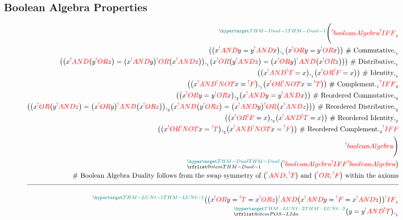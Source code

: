 \documentclass[a4paper]{article}
\makeatletter
\def\ml{\mleft}
\def\mr{\mright}
\newcommand{\cusnum}[2]{{#1}_{{\phantom{ }}_{#2}}}
\newcommand{\cusand}{,}
\newcommand{\cuspop}{.}
\newcommand{\eqComment}[1]{\text{  \# #1}}
\newcommand{\n}{\\[1.5ex] \hline \nonumber \\[0ex]}
\newcommand{\m}{\nonumber \\}
\newcommand\rfrlist[1]{%
    \forcsvlist{\rfrlist@item}{#1}
}
\newcommand\rfrlist@item[1]{\rfr{#1}\\}
\newcommand{\thmlink}[2]{{}_{\substack{\rfrlist{#1}}}^{\dfn{#2}} }
\makeatother
\begin{document}
\subsection{Boolean Algebra Properties}
\begin{tcolorbox}
\begin{align}
   \thmlink{}{THM-Dual-1} \Bigg(\rfr{booleanAlgebra} [\{\rfr{T}, \rfr{F}\}, \rfr{AND}, \rfr{OR}, \rfr{NOT}][] \cusnum{\rfr{IFF}}{1}
\m \ml(\ml(x \rfr{AND} y = y \rfr{AND} x\mr) \cusnum{\cusand}{1} \ml(x \rfr{OR} y = y \rfr{OR} x\mr)\mr) \eqComment{Commutative} \cusnum{\cusand}{1}
\m \ml(\ml(x \rfr{AND} \ml(y \rfr{OR} z\mr) = \ml(x \rfr{AND} y\mr) \rfr{OR} \ml(x \rfr{AND} z\mr)\mr) \cusnum{\cusand}{1} \ml(x \rfr{OR} \ml(y \rfr{AND} z\mr) = \ml(x \rfr{OR} y\mr) \rfr{AND} \ml(x \rfr{OR} z\mr)\mr)\mr) \eqComment{Distributive} \cusnum{\cusand}{1}
\m \ml(\ml(x \rfr{AND} \rfr{T} = x\mr) \cusnum{\cusand}{1} \ml(x \rfr{OR} \rfr{F} = x\mr)\mr) \eqComment{Identity} \cusnum{\cusand}{1}
\m \ml(\ml(x \rfr{AND} \rfr{NOT} x = \rfr{F}\mr) \cusnum{\cusand}{1} \ml(x \rfr{OR} \rfr{NOT} x = \rfr{T}\mr)\mr) \eqComment{Complement} \cusnum{\cuspop}{1} \cusnum{\rfr{IFF}}{2}
\m \ml(\ml(x \rfr{OR} y = y \rfr{OR} x\mr) \cusnum{\cusand}{2} \ml(x \rfr{AND} y = y \rfr{AND} x\mr)\mr) \eqComment{Reordered Commutative} \cusnum{\cusand}{2}
\m \ml(\ml(x \rfr{OR} \ml(y \rfr{AND} z\mr) = \ml(x \rfr{OR} y\mr) \rfr{AND} \ml(x \rfr{OR} z\mr)\mr) \cusnum{\cusand}{2} \ml(x \rfr{AND} \ml(y \rfr{OR} z\mr) = \ml(x \rfr{AND} y\mr) \rfr{OR} \ml(x \rfr{AND} z\mr)\mr)\mr) \eqComment{Reordered Distributive} \cusnum{\cusand}{2}
\m \ml(\ml(x \rfr{OR} \rfr{F} = x\mr) \cusnum{\cusand}{2} \ml(x \rfr{AND} \rfr{T} = x\mr)\mr) \eqComment{Reordered Identity} \cusnum{\cusand}{2}
\m \ml(\ml(x \rfr{OR} \rfr{NOT} x = \rfr{T}\mr) \cusnum{\cusand}{2} \ml(x \rfr{AND} \rfr{NOT} x = \rfr{F}\mr)\mr) \eqComment{Reordered Complement} \cusnum{\cuspop}{2} \rfr{IFF}
\m \rfr{booleanAlgebra} [\{\rfr{F}, \rfr{T}\}, \rfr{OR}, \rfr{AND}, \rfr{NOT}][]\Bigg)
\m \thmlink{THM-Dual-1}{THM-Dual} \ml(\rfr{booleanAlgebra} [\{\rfr{T}, \rfr{F}\}, \rfr{AND}, \rfr{OR}, \rfr{NOT}][] \rfr{IFF} \rfr{booleanAlgebra} [\{\rfr{F}, \rfr{T}\}, \rfr{OR}, \rfr{AND}, \rfr{NOT}][]\mr)
\m \eqComment{Boolean Algebra Duality follows from the swap symmetry of $\ml(\rfr{AND}, \rfr{T}\mr)$ and $\ml(\rfr{OR}, \rfr{F}\mr)$ within the axioms}
\n \thmlink{}{THM-LUNt-1} \ml(\ml(x \rfr{OR} y = \rfr{T} = x \rfr{OR} z\mr) \rfr{AND} \ml(x \rfr{AND} y = \rfr{F} = x \rfr{AND} z\mr)\mr) \cusnum{\rfr{IF}}{1}
\m \thmlink{POS-LIdn}{THM-LUNt-2} \ml(y = y \rfr{AND} \rfr{T}\mr) \cusnum{\cusand}{1}

\end{align}
\end{tcolorbox}
\end{document}

